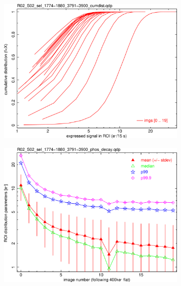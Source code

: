 \begin{figure}[!htbp]
\begin{subfigure}{0.45\textwidth}
  \centering
  \includegraphics[width=\textwidth]{figures/phosphorescence-survey/phos_kinetics/R02_S02_sel_1774-1880_3791-3900_cumdist.png}    
\end{subfigure}
\hfil
\begin{subfigure}{0.45\textwidth}
  \centering
  \includegraphics[width=\textwidth]{figures/phosphorescence-survey/phos_kinetics/R02_S02_sel_1774-1880_3791-3900_phos_decay.png}
\end{subfigure}
\newline
\begin{subfigure}{0.45\textwidth}    
  \centering

\end{subfigure}
\end{figure}
